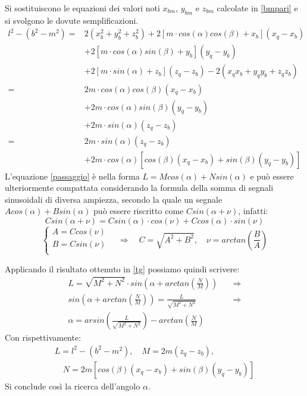\documentclass[12pt,twoside,openright]{report}
\begin{document}
Si sostituiscono le equazioni dei valori noti $x_{bm}$, $y_{bm}$ e $z_{bm}$ calcolate in \eqref{bmpari} e si svolgono le dovute semplificazioni.
\begin{align}\label{passaggio}
    l^2-(b^2-m^2) =& 2(x_{b}^2+y_{b}^2+z_{b}^2)+2[m \cdot cos(\alpha)cos(\beta)+x_b](x_q-x_b)\nonumber\\
    &+2[m \cdot cos(\alpha)sin(\beta)+y_b](y_q-y_b)
    \nonumber\\ &+2[m \cdot sin(\alpha)+z_b](z_q-z_b)-2(x_qx_b+y_qy_b+z_qz_b)\nonumber\\
    				   =& 2m \cdot cos(\alpha)cos(\beta)(x_q-x_b)\nonumber\\&+2m \cdot cos(\alpha)sin(\beta)(y_q-y_b)\nonumber\\
    				   & +2m \cdot sin(\alpha)(z_q-z_b)\nonumber\\
    				   =& 2m \cdot sin(\alpha)(z_q-z_b) \nonumber\\
    				   &+2m \cdot cos(\alpha)[cos(\beta)(x_q-x_b)+sin(\beta)(y_q-y_b)]   
\end{align}
L'equazione \eqref{passaggio} è nella forma $L=Mcos(\alpha)+Nsin(\alpha)$ e può essere ulteriormente compattata considerando la formula della somma di segnali sinusoidali di diversa ampiezza, secondo la quale un segnale $Acos(\alpha)+Bsin(\alpha)$ può essere riscritto come $Csin(\alpha + \nu)$, infatti:
\begin{equation}\label{c}
Csin(\alpha + \nu)=Csin(\alpha)\cdot cos(\nu)+Ccos(\alpha)\cdot sin(\nu)\nonumber
\end{equation}
\begin{equation}\label{tg}
    \begin{cases}
      A=Ccos(\nu)\\
      B=Csin(\nu)\\
    \end{cases}\quad \Rightarrow \quad  C=\sqrt{A^2+B^2}, \quad \nu=arctan\left(\frac{B}{A}\right)
\end{equation}

Applicando il risultato ottenuto in \eqref{tg} possiamo quindi scrivere:
\begin{align}\label{alfa}
    L= \sqrt{M^2+N^2}\cdot sin\left(\alpha+arctan\left(\frac{N}{M}\right)\right) \quad  &\Rightarrow\nonumber\\ sin\left(\alpha+arctan\left(\frac{N}{M}\right)\right)=\frac{L}{\sqrt{M^2+N^2}}  \quad  &\Rightarrow\nonumber\\
    \alpha=arsin\left(\frac{L}{\sqrt{M^2+N^2}}\right)-arctan\left(\frac{N}{M}\right)
\end{align}
Con rispettivamente:
\begin{align}\label{lnm}
L=l^2-(b^2-m^2), \quad M=2m(z_q-z_b),\nonumber \\ \quad N=2m[cos(\beta)(x_q-x_b)+sin(\beta)(y_q-y_b)]
\end{align}
Si conclude così la ricerca dell'angolo $\alpha$.
\end{document}
